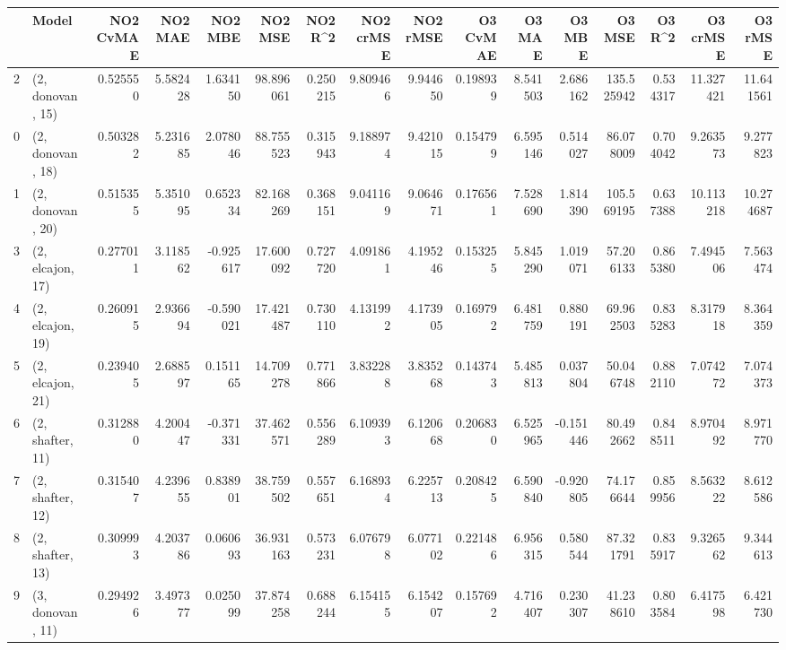\begin{tabular}{llrrrrrrrrrrrrrr}
\toprule
{} &             Model &  NO2 CvMAE &   NO2 MAE &   NO2 MBE &    NO2 MSE &   NO2 R\textasciicircum2 &  NO2 crMSE &  NO2 rMSE &  O3 CvMAE &    O3 MAE &    O3 MBE &      O3 MSE &    O3 R\textasciicircum2 &   O3 crMSE &    O3 rMSE \\
\midrule
2  &  (2, donovan, 15) &   0.525550 &  5.582428 &  1.634150 &  98.896061 &  0.250215 &   9.809466 &  9.944650 &  0.198939 &  8.541503 &  2.686162 &  135.525942 &  0.534317 &  11.327421 &  11.641561 \\
0  &  (2, donovan, 18) &   0.503282 &  5.231685 &  2.078046 &  88.755523 &  0.315943 &   9.188974 &  9.421015 &  0.154799 &  6.595146 &  0.514027 &   86.078009 &  0.704042 &   9.263573 &   9.277823 \\
1  &  (2, donovan, 20) &   0.515355 &  5.351095 &  0.652334 &  82.168269 &  0.368151 &   9.041169 &  9.064671 &  0.176561 &  7.528690 &  1.814390 &  105.569195 &  0.637388 &  10.113218 &  10.274687 \\
3  &  (2, elcajon, 17) &   0.277011 &  3.118562 & -0.925617 &  17.600092 &  0.727720 &   4.091861 &  4.195246 &  0.153255 &  5.845290 &  1.019071 &   57.206133 &  0.865380 &   7.494506 &   7.563474 \\
4  &  (2, elcajon, 19) &   0.260915 &  2.936694 & -0.590021 &  17.421487 &  0.730110 &   4.131992 &  4.173905 &  0.169792 &  6.481759 &  0.880191 &   69.962503 &  0.835283 &   8.317918 &   8.364359 \\
5  &  (2, elcajon, 21) &   0.239405 &  2.688597 &  0.151165 &  14.709278 &  0.771866 &   3.832288 &  3.835268 &  0.143743 &  5.485813 &  0.037804 &   50.046748 &  0.882110 &   7.074272 &   7.074373 \\
6  &  (2, shafter, 11) &   0.312880 &  4.200447 & -0.371331 &  37.462571 &  0.556289 &   6.109393 &  6.120668 &  0.206830 &  6.525965 & -0.151446 &   80.492662 &  0.848511 &   8.970492 &   8.971770 \\
7  &  (2, shafter, 12) &   0.315407 &  4.239655 &  0.838901 &  38.759502 &  0.557651 &   6.168934 &  6.225713 &  0.208425 &  6.590840 & -0.920805 &   74.176644 &  0.859956 &   8.563222 &   8.612586 \\
8  &  (2, shafter, 13) &   0.309993 &  4.203786 &  0.060693 &  36.931163 &  0.573231 &   6.076798 &  6.077102 &  0.221486 &  6.956315 &  0.580544 &   87.321791 &  0.835917 &   9.326562 &   9.344613 \\
9  &  (3, donovan, 11) &   0.294926 &  3.497377 &  0.025099 &  37.874258 &  0.688244 &   6.154155 &  6.154207 &  0.157692 &  4.716407 &  0.230307 &   41.238610 &  0.803584 &   6.417598 &   6.421730 \\

\end{tabular}
